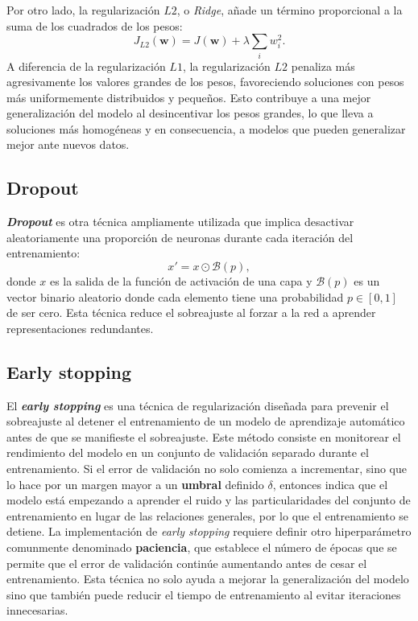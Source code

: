 Por otro lado, la regularización $L2$, o \textit{Ridge}, añade un término proporcional a la suma de los cuadrados de los pesos:
\[
J_{L2}(\mathbf{w}) = J(\mathbf{w}) + \lambda \sum_{i} w_i^2.
\]
A diferencia de la regularización $L1$, la regularización $L2$ penaliza más agresivamente los valores grandes de los pesos, favoreciendo soluciones con pesos más uniformemente distribuidos y pequeños. Esto contribuye a una mejor generalización del modelo al desincentivar los pesos grandes, lo que lleva a soluciones más homogéneas y en consecuencia, a modelos que pueden generalizar mejor ante nuevos datos.

\subsection{Dropout}

\textbf{\textit{Dropout}} es otra técnica ampliamente utilizada que implica desactivar aleatoriamente una proporción de neuronas durante cada iteración del entrenamiento:
\begin{equation}
	x' = x \odot \mathcal{B}(p),
\end{equation}
donde $x$ es la salida de la función de activación de una capa y $\mathcal{B}(p)$ es un vector binario aleatorio donde cada elemento tiene una probabilidad $p \in [0,1]$ de ser cero. Esta técnica reduce el sobreajuste al forzar a la red a aprender representaciones redundantes.

\subsection{Early stopping}

El \textbf{\textit{early stopping}} es una técnica de regularización diseñada para prevenir el sobreajuste al detener el entrenamiento de un modelo de aprendizaje automático antes de que se manifieste el sobreajuste. Este método consiste en monitorear el rendimiento del modelo en un conjunto de validación separado durante el entrenamiento. Si el error de validación no solo comienza a incrementar, sino que lo hace por un margen mayor a un \textbf{umbral} definido \(\delta\), entonces indica que el modelo está empezando a aprender el ruido y las particularidades del conjunto de entrenamiento en lugar de las relaciones generales, por lo que el entrenamiento se detiene. La implementación de \textit{early stopping} requiere definir otro hiperparámetro comunmente denominado \textbf{paciencia}, que establece el número de épocas que se permite que el error de validación continúe aumentando antes de cesar el entrenamiento. Esta técnica no solo ayuda a mejorar la generalización del modelo sino que también puede reducir el tiempo de entrenamiento al evitar iteraciones innecesarias.


